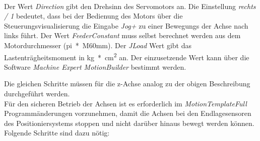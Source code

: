 \documentclass[../../../Bachelorarbeit.tex]{subfiles}
\begin{document}
\begin{enumerate}
\begin{minipage}[t]{\linewidth}
        \raggedright
        \label{fig:my-img35}
    \end{minipage}
    \bigskip \\
    Der Wert \textit{Direction} gibt den Drehsinn des Servomotors an. Die Einstellung \textit{rechts / 1} bedeutet, dass bei der Bedienung des Motors über die Steuerungsvisualisierung die Eingabe \textit{Jog+} zu einer Bewegungs der Achse nach links führt. Der Wert \textit{FeederConstant} muss selbst berechnet werden aus dem Motordurchmesser (\si{pi*M60mm}). Der \textit{JLoad} Wert gibt das Lastenträgheitsmoment in \si{kg*cm^2} an. Der einzusetzende Wert kann über die Software \textit{Machine Expert MotionBuilder} bestimmt werden. 
\end{enumerate}

Die gleichen Schritte müssen für die z-Achse analog zu der obigen Beschreibung durchgeführt werden.\\
\bigskip
Für den sicheren Betrieb der Achsen ist es erforderlich im \textit{MotionTemplateFull} Programmänderungen vorzunehmen, damit die Achsen bei den Endlagesensoren des Positioniersystems stoppen und nicht darüber hinaus bewegt werden können. Folgende Schritte sind dazu nötig:
\end{document}
